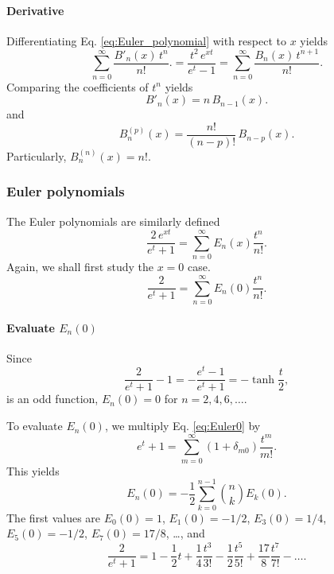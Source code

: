 \documentclass[aip,jcp,preprint,notitlepage, superscriptaddress]{revtex4-1}
\begin{document}
\paragraph{Derivative}




Differentiating Eq. \eqref{eq:Euler_polynomial}
with respect to $x$ yields
\[
\sum_{n = 0}^\infty \frac{ B'_n(x) \, t^{n} } { n! }.
=
\frac{ t^2 \, e^{x t} }
{ e^t - 1 }
=
\sum_{n = 0}^\infty \frac{ B_n(x) \, t^{n + 1} } { n! }.
\]
Comparing the coefficients of $t^n$ yields
\[
B'_n(x)
=
n \, B_{n-1}(x).
\]
and
\begin{equation}
  B^{(p)}_n(x)
=
\frac{n!}{(n-p)!} \, B_{n-p}(x).
\label{eq:dBernoulli_polynomial}
\end{equation}
Particularly,
$B^{(n)}_n(x) = n!$.



\subsubsection{Euler polynomials}



The Euler polynomials are similarly defined
%
\begin{equation}
  \frac{ 2 \, e^{x t} }
  {e^t + 1}
=
\sum_{n = 0}^\infty
  E_n(x) \frac{ t^n } { n! }.
\label{eq:Euler_polynomial}
\end{equation}
%
Again, we shall first study the $x = 0$ case.
%
\begin{equation}
  \frac{ 2 }
  {e^t + 1}
=
\sum_{n = 0}^\infty
  E_n(0) \frac{ t^n } { n! }.
\label{eq:Euler0}
\end{equation}



\paragraph{Evaluate $E_n(0)$}



Since
\[
\frac{ 2 } {e^t + 1} - 1
=
-\frac{ e^t - 1 } {e^t + 1}
=
-\tanh \frac t 2,
\]
is an odd function,
$E_{n}(0) = 0$
for $n = 2, 4, 6, \dots$.



To evaluate $E_n(0)$,
we multiply Eq. \eqref{eq:Euler0}
by
\[
e^t + 1
=
\sum_{m = 0}^\infty
  (1 + \delta_{m0}) \frac{ t^m }{ m! }.
\]
This yields
\[
E_n(0)
=
-\frac{1}{2}
\sum_{k = 0}^{n - 1}
{n \choose k} E_k(0).
\]
The first values are
$E_0(0) = 1$,
$E_1(0) = -1/2$,
$E_3(0) = 1/4$,
$E_5(0) = -1/2$,
$E_7(0) = 17/8$,
\dots,
%
and
%
\begin{equation}
\frac 2 {e^t + 1}
=
1 - \frac 1 2 t
+ \frac 1 4 \frac{ t^3 }{ 3! }
- \frac 1 2 \frac{ t^5 }{ 5! }
+ \frac{ 17 }{ 8 } \frac{ t^7 }{ 7! }
- \dots.
\label{eq:Euler0_first}
\end{equation}
\end{document}
